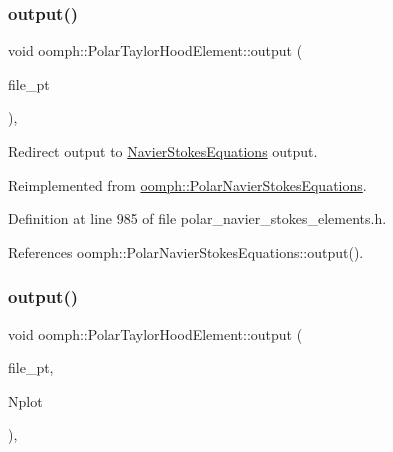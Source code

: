 \mbox{\label{classoomph_1_1PolarTaylorHoodElement_ab1d58fc5d344421bdf29ea11514accb6}} 
\subsubsection{\texorpdfstring{output()}{output()}\hspace{0.1cm}{\footnotesize\ttfamily [3/4]}}
{\footnotesize\ttfamily void oomph\+::\+Polar\+Taylor\+Hood\+Element\+::output (\begin{DoxyParamCaption}\item[{F\+I\+LE $\ast$}]{file\+\_\+pt }\end{DoxyParamCaption})\hspace{0.3cm}{\ttfamily [inline]}, {\ttfamily [virtual]}}



Redirect output to \hyperlink{classoomph_1_1NavierStokesEquations}{Navier\+Stokes\+Equations} output. 



Reimplemented from \hyperlink{classoomph_1_1PolarNavierStokesEquations_aad582ad191d1dd67ee148495ee46778e}{oomph\+::\+Polar\+Navier\+Stokes\+Equations}.



Definition at line 985 of file polar\+\_\+navier\+\_\+stokes\+\_\+elements.\+h.



References oomph\+::\+Polar\+Navier\+Stokes\+Equations\+::output().

\mbox{\label{classoomph_1_1PolarTaylorHoodElement_a491915435066f5545da449fd2ac5e3a7}} 
\subsubsection{\texorpdfstring{output()}{output()}\hspace{0.1cm}{\footnotesize\ttfamily [4/4]}}
{\footnotesize\ttfamily void oomph\+::\+Polar\+Taylor\+Hood\+Element\+::output (\begin{DoxyParamCaption}\item[{F\+I\+LE $\ast$}]{file\+\_\+pt,  }\item[{const unsigned \&}]{Nplot }\end{DoxyParamCaption})\hspace{0.3cm}{\ttfamily [inline]}, {\ttfamily [virtual]}}



